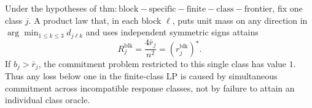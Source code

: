 Under the hypotheses of \(\mathrm{thm:block-specific-finite-class-frontier}\), fix one class \(j\). A product law that, in each block \(\ell\), puts unit mass on any direction in \(\arg\min_{1\le k\le3}d_{j\ell k}\) and uses independent symmetric signs attains
\[
R_j^{\mathrm{blk}}=\frac{4\bar r_j}{n^2}=(r_j^{\mathrm{blk}})^\star.
\]
If \(b_j>\bar r_j\), the commitment problem restricted to this single class has value \(1\). Thus any loss below one in the finite-class LP is caused by simultaneous commitment across incompatible response classes, not by failure to attain an individual class oracle.